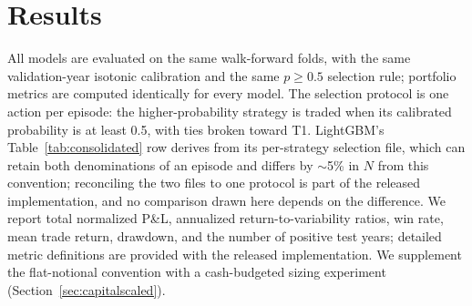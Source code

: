 \documentclass[sigconf,review]{acmart}
\begin{document}
\section{Results}
\label{sec:results}

All models are evaluated on the same walk-forward folds, with the same validation-year isotonic calibration and the same $p\ge0.5$ selection rule; portfolio metrics are computed identically for every model. The selection protocol is one action per episode: the higher-probability strategy is traded when its calibrated probability is at least 0.5, with ties broken toward T1. LightGBM's Table~\ref{tab:consolidated} row derives from its per-strategy selection file, which can retain both denominations of an episode and differs by $\sim$5\% in $N$ from this convention; reconciling the two files to one protocol is part of the released implementation, and no comparison drawn here depends on the difference. We report total normalized P\&L, annualized return-to-variability ratios, win rate, mean trade return, drawdown, and the number of positive test years; detailed metric definitions are provided with the released implementation. We supplement the flat-notional convention with a cash-budgeted sizing experiment (Section~\ref{sec:capitalscaled}).
\end{document}
